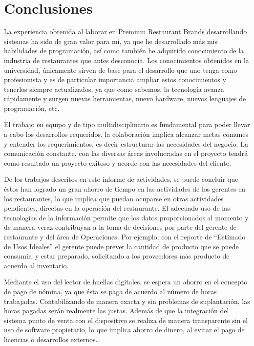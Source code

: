 
\chapter{Conclusiones}
\label{chap:conclusiones}

La experiencia obtenida al laborar en Premium Restaurant Brands desarrollando sistemas ha sido de gran valor para mi, ya que he desarrollado más mis habilidades de programación, así como también he adquirido conocimiento de la industria de restaurantes que antes desconocía. Los conocimientos obtenidos en la universidad, únicamente sirven de base para el desarrollo que uno tenga como profesionista y es de particular importancia ampliar estos conocimientos y tenerlos siempre actualizados, ya que como sabemos, la tecnología avanza rápidamente y surgen nuevas herramientas, nuevo hardware, nuevos lenguajes de programación, etc.

El trabajo en equipo y de tipo multidisciplinario es fundamental para poder llevar a cabo los desarrollos requeridos, la colaboración implica alcanzar metas comunes y entender los requerimientos, es decir estructurar las necesidades del negocio. La comunicación constante, con las diversas áreas involucradas en el proyecto tendrá como resultado un proyecto exitoso y acorde con las necesidades del cliente.

De los trabajos descritos en este informe de actividades, se puede concluir que éstos han logrado un gran ahorro de tiempo en las actividades de los gerentes en los restaurantes, lo que implica que puedan ocuparse en otras actividades pendientes, directas en la operación del restaurante. El adecuado uso de las tecnologías de la información permite que los datos proporcionados al momento y de manera veraz contribuyan a la toma de decisiones por parte del gerente de restaurante y del área de Operaciones. Por ejemplo, con el reporte de ``Estimado de Usos Ideales'' el gerente puede prever la cantidad de producto que se puede consumir, y estar preparado, solicitando a los proveedores más producto de acuerdo al inventario.

Mediante el uso del lector de huellas digitales, se espera un ahorro en el concepto de pago de nómina, ya que ésta se paga de acuerdo al número de horas trabajadas. Contabilizando de manera exacta y sin problemas de suplantación, las horas pagadas serán realmente las justas. Además de que la integración del sistema punto de venta con el dispositivo se realiza de manera transparente sin el uso de software propietario, lo que implica ahorro de dinero, al evitar el pago de licencias o desarrollos externos.


